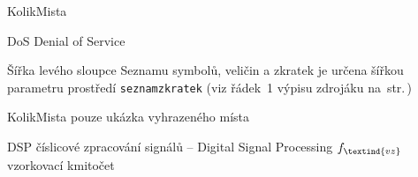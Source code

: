 \begin{seznamzkratek}{KolikMista}

		{DoS}
		{Denial of Service}

		{Šířka levého sloupce Seznamu symbolů, veličin a zkratek}								%
		{je určena šířkou parametru prostředí \texttt{seznamzkratek} (viz řádek~1 výpisu zdrojáku na~str.\,\pageref{lst:zkratky})}

		{KolikMista}
		{pouze ukázka vyhrazeného místa}

		{DSP}								%
		{číslicové zpracování signálů -- Digital Signal Processing}
		{\ensuremath{f_\textind{vz}}} %
		{vzorkovací kmitočet}					%

\end{seznamzkratek}
